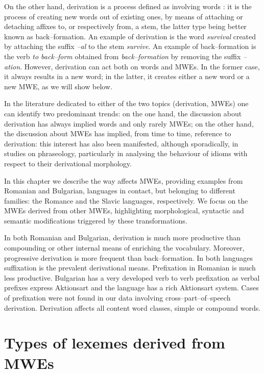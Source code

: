 \documentclass[output=paper]{langsci/langscibook}
\begin{document}
On the other hand, derivation is a process defined as involving words \linebreak
\citep{marouzeau1933}: it is the process of creating new words out of
existing ones, by means of attaching or detaching affixes to, or
respectively from, a stem, the latter type being better known as
back–formation. An example of derivation is the word \textit{survival} created
by attaching the suffix \textit{–al} to the stem \textit{survive}. An example of
back–formation is the verb \textit{to back–form} obtained from
\textit{back–formation} by removing the suffix \textit{–ation}. However, derivation
can act both on words and MWEs. In the former case, it always results
in a new word; in the latter, it creates either a new word or a new
MWE, as we will show below.



In the literature dedicated to either of the two topics (derivation,
MWEs) one can identify two predominant trends: on the one hand, the
discussion about derivation has always implied words and only rarely
MWEs; on the other hand, the discussion about MWEs has implied, from
time to time, reference to derivation: this interest has also been
manifested, although sporadically, in studies on phraseology,
particularly in analysing the behaviour of idioms with respect to their
derivational morphology. 



In this chapter we describe the way  affects MWEs, providing
examples from Romanian and Bulgarian, languages in contact, but
belonging to different families: the Romance and the Slavic languages,
respectively. We focus on the MWEs derived from other MWEs,
highlighting morphological, syntactic and semantic modifications
triggered by these transformations.



In both Romanian and Bulgarian, derivation is much more productive than
compounding or other internal means of enriching the vocabulary.
Moreover, progressive derivation is more frequent than back–formation.
In both languages suffixation is the prevalent derivational means.
Prefixation in Romanian is much less productive. Bulgarian has a very
developed verb to verb prefixation as verbal prefixes express
Aktionsart and the language has a rich Aktionsart system. Cases of
prefixation were not found in our data involving cross–part–of–speech
derivation. Derivation affects all content word classes, simple or
compound words.


\section{Types of lexemes derived from MWEs}
\end{document}
